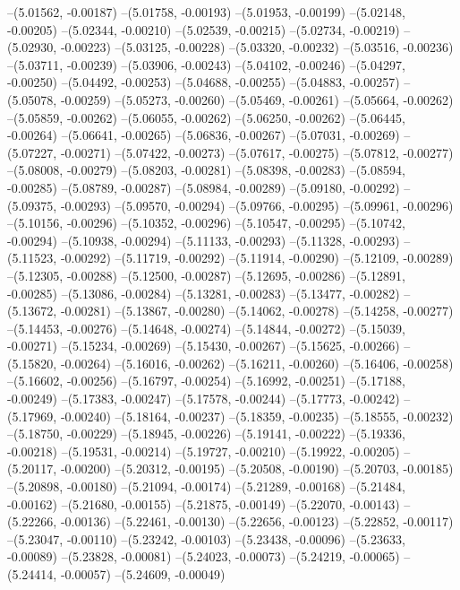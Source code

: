 --(5.01562, -0.00187)
--(5.01758, -0.00193)
--(5.01953, -0.00199)
--(5.02148, -0.00205)
--(5.02344, -0.00210)
--(5.02539, -0.00215)
--(5.02734, -0.00219)
--(5.02930, -0.00223)
--(5.03125, -0.00228)
--(5.03320, -0.00232)
--(5.03516, -0.00236)
--(5.03711, -0.00239)
--(5.03906, -0.00243)
--(5.04102, -0.00246)
--(5.04297, -0.00250)
--(5.04492, -0.00253)
--(5.04688, -0.00255)
--(5.04883, -0.00257)
--(5.05078, -0.00259)
--(5.05273, -0.00260)
--(5.05469, -0.00261)
--(5.05664, -0.00262)
--(5.05859, -0.00262)
--(5.06055, -0.00262)
--(5.06250, -0.00262)
--(5.06445, -0.00264)
--(5.06641, -0.00265)
--(5.06836, -0.00267)
--(5.07031, -0.00269)
--(5.07227, -0.00271)
--(5.07422, -0.00273)
--(5.07617, -0.00275)
--(5.07812, -0.00277)
--(5.08008, -0.00279)
--(5.08203, -0.00281)
--(5.08398, -0.00283)
--(5.08594, -0.00285)
--(5.08789, -0.00287)
--(5.08984, -0.00289)
--(5.09180, -0.00292)
--(5.09375, -0.00293)
--(5.09570, -0.00294)
--(5.09766, -0.00295)
--(5.09961, -0.00296)
--(5.10156, -0.00296)
--(5.10352, -0.00296)
--(5.10547, -0.00295)
--(5.10742, -0.00294)
--(5.10938, -0.00294)
--(5.11133, -0.00293)
--(5.11328, -0.00293)
--(5.11523, -0.00292)
--(5.11719, -0.00292)
--(5.11914, -0.00290)
--(5.12109, -0.00289)
--(5.12305, -0.00288)
--(5.12500, -0.00287)
--(5.12695, -0.00286)
--(5.12891, -0.00285)
--(5.13086, -0.00284)
--(5.13281, -0.00283)
--(5.13477, -0.00282)
--(5.13672, -0.00281)
--(5.13867, -0.00280)
--(5.14062, -0.00278)
--(5.14258, -0.00277)
--(5.14453, -0.00276)
--(5.14648, -0.00274)
--(5.14844, -0.00272)
--(5.15039, -0.00271)
--(5.15234, -0.00269)
--(5.15430, -0.00267)
--(5.15625, -0.00266)
--(5.15820, -0.00264)
--(5.16016, -0.00262)
--(5.16211, -0.00260)
--(5.16406, -0.00258)
--(5.16602, -0.00256)
--(5.16797, -0.00254)
--(5.16992, -0.00251)
--(5.17188, -0.00249)
--(5.17383, -0.00247)
--(5.17578, -0.00244)
--(5.17773, -0.00242)
--(5.17969, -0.00240)
--(5.18164, -0.00237)
--(5.18359, -0.00235)
--(5.18555, -0.00232)
--(5.18750, -0.00229)
--(5.18945, -0.00226)
--(5.19141, -0.00222)
--(5.19336, -0.00218)
--(5.19531, -0.00214)
--(5.19727, -0.00210)
--(5.19922, -0.00205)
--(5.20117, -0.00200)
--(5.20312, -0.00195)
--(5.20508, -0.00190)
--(5.20703, -0.00185)
--(5.20898, -0.00180)
--(5.21094, -0.00174)
--(5.21289, -0.00168)
--(5.21484, -0.00162)
--(5.21680, -0.00155)
--(5.21875, -0.00149)
--(5.22070, -0.00143)
--(5.22266, -0.00136)
--(5.22461, -0.00130)
--(5.22656, -0.00123)
--(5.22852, -0.00117)
--(5.23047, -0.00110)
--(5.23242, -0.00103)
--(5.23438, -0.00096)
--(5.23633, -0.00089)
--(5.23828, -0.00081)
--(5.24023, -0.00073)
--(5.24219, -0.00065)
--(5.24414, -0.00057)
--(5.24609, -0.00049)
